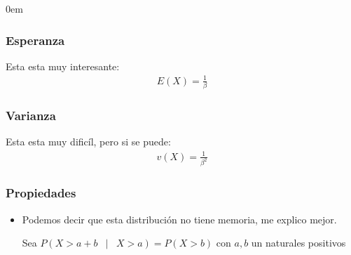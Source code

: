 \documentclass[12pt, fleqn]{report}                             %
\newenvironment{SmallIndentation}[1][0.75em]                    %
        {\begin{adjustwidth}{#1}{}\begin{footnotesize}}             %
        {\end{footnotesize}\end{adjustwidth}}                       %
\DeclareMathOperator \Space {\quad}                             %
\DeclareMathOperator \MiniSpace {\;}                            %
\newcommand \Such {\MiniSpace | \MiniSpace}                     %
\theoremstyle{break}                                            %
\begin{document}
\begin{multicols}{2}
\begin{SmallIndentation}[0em]
                    \subsubsection{Esperanza}

                        Esta esta muy interesante:
                        \begin{align*}
                            E(X) = \frac{1}{\beta}                    
                        \end{align*}

                    \subsubsection{Varianza}

                        Esta esta muy dificíl, pero si se puede:
                        \begin{align*}
                            v(X) = \frac{1}{\beta^2}
                        \end{align*}


                    \subsubsection{Propiedades}

                        \begin{itemize}
                            
                            \item 
                                Podemos decir que esta distribución no tiene memoria, me explico
                                mejor.

                                Sea $P(X > a + b \Such X > a) = P(X > b)$ con $a, b$ un naturales positivos


\end{itemize}
\end{SmallIndentation}
\end{multicols}
\end{document}
